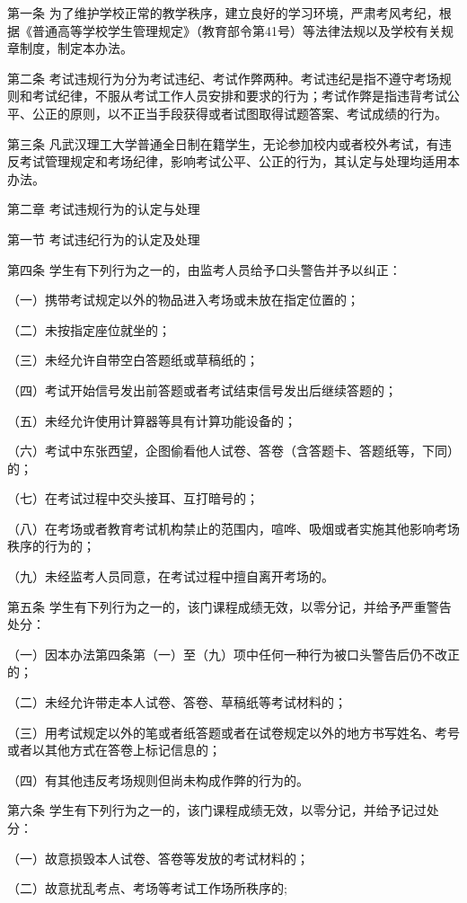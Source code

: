 \documentclass[UTF8,12pt,a4paper]{report}
\begin{document}
第一条  为了维护学校正常的教学秩序，建立良好的学习环境，严肃考风考纪，根据《普通高等学校学生管理规定》（教育部令第41号）等法律法规以及学校有关规章制度，制定本办法。

第二条  考试违规行为分为考试违纪、考试作弊两种。考试违纪是指不遵守考场规则和考试纪律，不服从考试工作人员安排和要求的行为；考试作弊是指违背考试公平、公正的原则，以不正当手段获得或者试图取得试题答案、考试成绩的行为。

第三条  凡武汉理工大学普通全日制在籍学生，无论参加校内或者校外考试，有违反考试管理规定和考场纪律，影响考试公平、公正的行为，其认定与处理均适用本办法。



第二章  考试违规行为的认定与处理

第一节  考试违纪行为的认定及处理

第四条  学生有下列行为之一的，由监考人员给予口头警告并予以纠正：

（一）携带考试规定以外的物品进入考场或未放在指定位置的；

（二）未按指定座位就坐的；

（三）未经允许自带空白答题纸或草稿纸的；

（四）考试开始信号发出前答题或者考试结束信号发出后继续答题的；

（五）未经允许使用计算器等具有计算功能设备的；

（六）考试中东张西望，企图偷看他人试卷、答卷（含答题卡、答题纸等，下同）的；

（七）在考试过程中交头接耳、互打暗号的；

（八）在考场或者教育考试机构禁止的范围内，喧哗、吸烟或者实施其他影响考场秩序的行为的；

（九）未经监考人员同意，在考试过程中擅自离开考场的。

第五条  学生有下列行为之一的，该门课程成绩无效，以零分记，并给予严重警告处分：

（一）因本办法第四条第（一）至（九）项中任何一种行为被口头警告后仍不改正的；

（二）未经允许带走本人试卷、答卷、草稿纸等考试材料的；

（三）用考试规定以外的笔或者纸答题或者在试卷规定以外的地方书写姓名、考号或者以其他方式在答卷上标记信息的； 

（四）有其他违反考场规则但尚未构成作弊的行为的。

第六条  学生有下列行为之一的，该门课程成绩无效，以零分记，并给予记过处分：

（一）故意损毁本人试卷、答卷等发放的考试材料的；

（二）故意扰乱考点、考场等考试工作场所秩序的;
\end{document}
